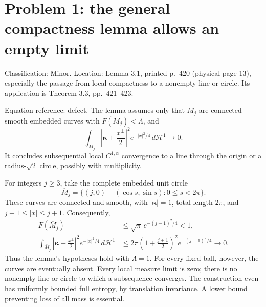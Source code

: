 \documentclass[10pt]{article}
\begin{document}
\section*{Problem 1: the general compactness lemma allows an empty limit}
Classification: Minor. Location: Lemma 3.1, printed p. 420 (physical page 13), especially the passage from local compactness to a nonempty line or circle. Its application is Theorem 3.3, pp. 421–423.\par
Equation reference: defect. The lemma assumes only that \(\overline M_j\) are connected smooth embedded curves with \(F(\overline M_j)<\Lambda\), and \[
 \int_{\overline M_j}
 \left|\boldsymbol\kappa+\frac{x^\perp}{2}\right|^2
 e^{-|x|^2/4}\,d\mathcal H^1\longrightarrow0.\] It concludes subsequential local \(C^{1,\alpha}\) convergence to a line through the origin or a radius-\(\sqrt2\) circle, possibly with multiplicity.\par
For integers \(j\ge3\), take the complete embedded unit circle \[\overline M_j=\{(j,0)+(\cos s,\sin s):0\le s<2\pi\}.\] These curves are connected and smooth, with \(|\boldsymbol\kappa|=1\), total length \(2\pi\), and \(j-1\le |x|\le j+1\). Consequently, \[\begin{aligned}
 F(\overline M_j)&\le\sqrt\pi\,e^{-(j-1)^2/4}<1,\\
 \int_{\overline M_j}\left|\boldsymbol\kappa+\frac{x^\perp}{2}\right|^2
 e^{-|x|^2/4}\,d\mathcal H^1
 &\le2\pi\left(1+\frac{j+1}{2}\right)^2e^{-(j-1)^2/4}
 \longrightarrow0.\end{aligned}\] Thus the lemma’s hypotheses hold with \(\Lambda=1\). For every fixed ball, however, the curves are eventually absent. Every local measure limit is zero; there is no nonempty line or circle to which a subsequence converges. The construction even has uniformly bounded full entropy, by translation invariance. A lower bound preventing loss of all mass is essential.\par
\end{document}
